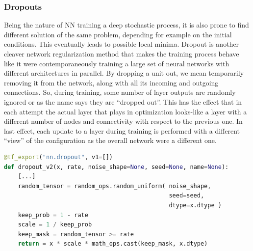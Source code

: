 \subsubsection{Dropouts}
Being the nature of NN training a deep stochastic process, it is also prone to find different solution of the same problem, depending for example on the initial conditions. This eventually leads to possible local minima. 
Dropout is another cleaver network regularization method that makes the training process behave like it were contemporaneously training a large set of neural networks with different architectures in parallel.
By dropping a unit out, we mean temporarily removing it from the network, along with all its incoming and outgoing connections.
So, during training, some number of layer outputs are randomly ignored or as the name says they are “dropped out”. This has the effect that in each attempt the actual layer that plays in optimization looks-like a layer with a different number of nodes and connectivity with respect to the previous one. In last effect, each update to a layer during training is performed with a different “view” of the configuration as the overall network were a different one.

\begin{lstlisting}[language=Python, caption=Dropout layer code example (from Tensorflow 2.0)]
@tf_export("nn.dropout", v1=[])
def dropout_v2(x, rate, noise_shape=None, seed=None, name=None):
    [...]
    random_tensor = random_ops.random_uniform( noise_shape, 
                                               seed=seed, 
                                               dtype=x.dtype )
    keep_prob = 1 - rate
    scale = 1 / keep_prob
    keep_mask = random_tensor >= rate
    return = x * scale * math_ops.cast(keep_mask, x.dtype)
\end{lstlisting}

